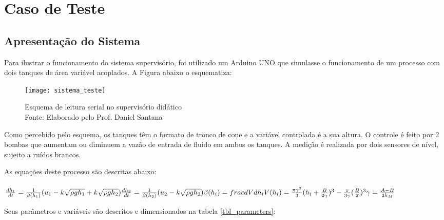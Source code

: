 \chapter{Caso de Teste}

\section{Apresentação do Sistema}

Para ilustrar o funcionamento do sistema supervisório, foi utilizado um Arduino UNO que simulasse o funcionamento de um processo com dois tanques de área variável acoplados. A Figura abaixo o esquematiza:

\begin{figure}[H]
	\centering
	\texttt{[image: sistema\_teste]}
	\caption{Esquema de leitura serial no supervisório didático\\Fonte: Elaborado pelo Prof. Daniel Santana}
	\label{img_sistema_teste}
\end{figure}

Como percebido pelo esquema, os tanques têm o formato de tronco de cone e a variável controlada é a sua altura. O controle é feito por 2 bombas que aumentam ou diminuem a vazão de entrada de fluido em ambos os tanques. A medição é realizada por dois sensores de nível, sujeito a ruídos brancos.

As equações deste processo são descritas abaixo:
\\\\
$
\frac{dh_1}{dt} = \frac{1}{\beta(h_1)}(u_1 - k\sqrt{\rho g h_1} + k\sqrt{\rho g h_2})\\
\frac{dh_2}{dt} = \frac{1}{\beta(h_2)}(u_2 - k\sqrt{\rho g h_2})\\
\beta(h_i) = frac{dV}{dh_i}\\
V(h_i) = \frac{\pi\gamma^2}{3}(h_i + \frac{B}{2\gamma})^3 - \frac{\pi}{3\gamma}(\frac{B}{2})^3\\
\gamma = \frac{A-B}{2h_M}\\
$

Seus parâmetros e variáveis são descritos e dimensionados na tabela \ref{tbl_parameters}:


